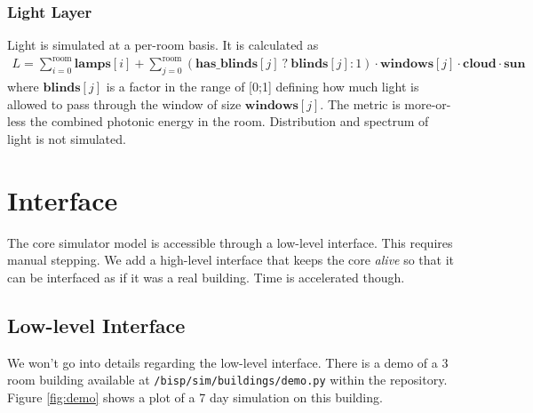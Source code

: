 \documentclass[10pt]{article}
\begin{document}
\subsubsection{Light Layer}

Light is simulated at a per-room basis. It is calculated as
\begin{eqnarray}
  \nonumber L =
            \sum\limits_{i=0}^{\mathrm{room}} \mathbf{lamps}[i] +
            \sum\limits_{j=0}^{\mathrm{room}}
            \left(
              \mathbf{has\_blinds}[j] ~?~ \mathbf{blinds}[j] : 1
            \right) \cdot \mathbf{windows}[j] \cdot \mathbf{cloud} \cdot \mathbf{sun}
\end{eqnarray}
where $\mathbf{blinds}[j]$ is a factor in the range of [0;1] defining how much light is allowed to pass through the window of size $\mathbf{windows}[j]$. The metric is more-or-less the combined photonic energy in the room. Distribution and spectrum of light is not simulated.


\section{Interface}
\label{sec:interface}

The core simulator model is accessible through a low-level interface. This requires manual stepping. We add a high-level interface that keeps the core \textsl{alive} so that it can be interfaced as if it was a real building. Time is accelerated though.

\subsection{Low-level Interface}

We won't go into details regarding the low-level interface. There is a demo of a 3 room building available at \texttt{/bisp/sim/buildings/demo.py} within the repository. Figure \ref{fig:demo} shows a plot of a 7 day simulation on this building.
\end{document}
